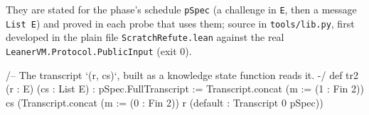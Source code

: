 They are stated for the phase's schedule \texttt{pSpec} (a challenge in \texttt{E}, then a message \texttt{List E}) and proved in each probe that uses them; source in \texttt{tools/\allowbreak{}lib.\allowbreak{}py}, first developed in the plain file \texttt{ScratchRefute.\allowbreak{}lean} against the real \texttt{L\allowbreak{}e\allowbreak{}a\allowbreak{}n\allowbreak{}e\allowbreak{}r\allowbreak{}V\allowbreak{}M\allowbreak{}.\allowbreak{}P\allowbreak{}r\allowbreak{}o\allowbreak{}t\allowbreak{}o\allowbreak{}c\allowbreak{}o\allowbreak{}l\allowbreak{}.\allowbreak{}P\allowbreak{}u\allowbreak{}b\allowbreak{}l\allowbreak{}i\allowbreak{}c\allowbreak{}I\allowbreak{}n\allowbreak{}p\allowbreak{}u\allowbreak{}t} (exit 0).

\begin{leancode}
/-- The transcript `(r, cs)`, built as a knowledge state function reads it. -/
def tr2 (r : E) (cs : List E) : pSpec.FullTranscript :=
  Transcript.concat (m := (1 : Fin 2)) cs
    (Transcript.concat (m := (0 : Fin 2)) r (default : Transcript 0 pSpec))


\end{leancode}
